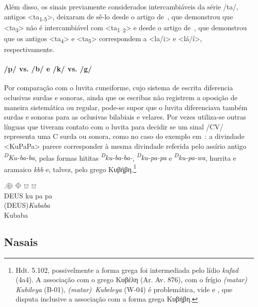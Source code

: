 Além disso, os sinais previamente considerados intercambiáveis da série
/ta/, antigos <ta\textsubscript{1-5}>, deixaram de sê-lo desde o artigo
de~\citet{Rieken2008}, que demonstrou que <ta\textsubscript{3}> não é
intercambiável com <ta\textsubscript{1--2}> e desde o artigo
de~\citet{RiekenYakubovich2010}, que demonstrou que os antigos
<ta\textsubscript{4}> e <ta\textsubscript{5}> correspondem a <la\slash{}i> e
<lá\slash{}í>, respectivamente.

\paragraph{/p/ vs. /b/ e /k/ vs. /g/}
Por comparação com o luvita cuneiforme, cujo sistema de
escrita diferencia oclusivas surdas e sonoras, ainda que os escribas não
registrem a oposição de maneira sistemática ou regular, pode-se supor que o
luvita diferenciava também surdas e sonoras para as oclusivas bilabiais e
velares.
Por vezes utiliza-se outras línguas que tiveram contato com o luvita para
decidir se um sinal /CV/ representa uma C surda ou sonora, como no caso do
exemplo em~\Next: a divindade <KuPaPa> parece corresponder à mesma
divindade referida pelo assírio antigo \emph{\textsuperscript{D}Ku-ba-ba},
pelas formas hititas \emph{\textsuperscript{D}ku-ba-ba-},
\mbox{\emph{\textsuperscript{D}ku-pa-pa}} e \emph{\textsuperscript{D}ku-pa-wa},
hurrita e aramaico \emph{kbb} e, talvez, pelo grego Κυβήβη.\footnote{%
	Hdt. 5.102, possivelmente a forma grega foi intermediada pelo lídio
	\emph{kufad} (4a4).
	A associação com o grego Κυβέλη (Ar. Av. 876), com o frígio
	\emph{(matar) Kubileya} (B-01), \mbox{\emph{(matar) Kubeleya}} (\mbox{W-04})
	é problemática, vide \citet[280--1]{Obrador2020} e \citet{Oreshko2021},
	que disputa inclusive a associação com a forma grega Κυβήβη.
}


\exg.\Large 𔖖 \Large 𔗜 \Large 𔕸 \Large 𔕸\\
DEUS ku pa pa\\
(DEUS)\emph{Kubaba} \\
Kubaba


\subsection{Nasais}

